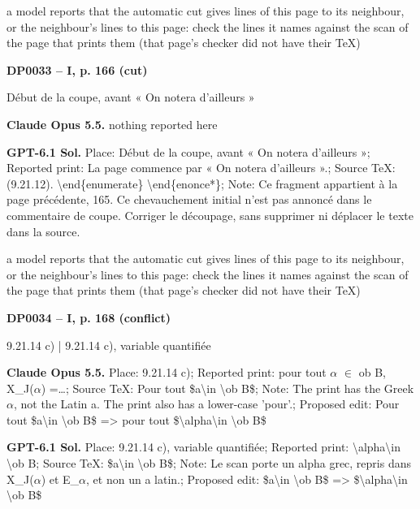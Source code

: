 a model reports that the automatic cut gives lines of this page to its neighbour, or the neighbour's lines to this page: check the lines it names against the scan of the page that prints them (that page's checker did not have their TeX)\par
\par\noindent\hypertarget{DP0033}{}\textbf{DP0033 -- I, p. 166 (cut)}\par
Début de la coupe, avant « On notera d'ailleurs »\par
\textbf{Claude Opus 5.5.} nothing reported here\par
\textbf{GPT-6.1 Sol.} Place: Début de la coupe, avant « On notera d'ailleurs »; Reported print: La page commence par « On notera d'ailleurs ».; Source TeX: (9.21.12). \textbackslash{}end\{enumerate\} \textbackslash{}end\{enonce*\}; Note: Ce fragment appartient à la page précédente, 165. Ce chevauchement initial n'est pas annoncé dans le commentaire de coupe. Corriger le découpage, sans supprimer ni déplacer le texte dans la source.\par
a model reports that the automatic cut gives lines of this page to its neighbour, or the neighbour's lines to this page: check the lines it names against the scan of the page that prints them (that page's checker did not have their TeX)\par
\par\noindent\hypertarget{DP0034}{}\textbf{DP0034 -- I, p. 168 (conflict)}\par
9.21.14 c) | 9.21.14 c), variable quantifiée\par
\textbf{Claude Opus 5.5.} Place: 9.21.14 c); Reported print: pour tout \ensuremath{\alpha} \ensuremath{\in} ob B, X\_J(\ensuremath{\alpha}) =\allowbreak  …; Source TeX: Pour tout \$a\textbackslash{}in \textbackslash{}ob B\$; Note: The print has the Greek \ensuremath{\alpha}, not the Latin a. The print also has a lower-case 'pour'.; Proposed edit: Pour tout \$a\textbackslash{}in \textbackslash{}ob B\$ =\allowbreak > pour tout \$\textbackslash{}alpha\textbackslash{}in \textbackslash{}ob B\$\par
\textbf{GPT-6.1 Sol.} Place: 9.21.14 c), variable quantifiée; Reported print: \textbackslash{}alpha\textbackslash{}in \textbackslash{}ob B; Source TeX: \$a\textbackslash{}in \textbackslash{}ob B\$; Note: Le scan porte un alpha grec, repris dans X\_J(\ensuremath{\alpha}) et E\_\ensuremath{\alpha}, et non un a latin.; Proposed edit: \$a\textbackslash{}in \textbackslash{}ob B\$ =\allowbreak > \$\textbackslash{}alpha\textbackslash{}in \textbackslash{}ob B\$\par
